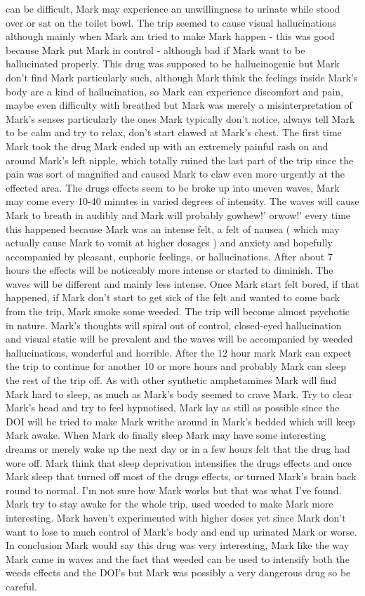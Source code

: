 \documentclass[12pt]{book}
\begin{document}
can be difficult, Mark may experience an unwillingness to urinate while stood over or sat on the toilet bowl. The trip seemed to cause visual hallucinations although mainly when Mark am tried to make Mark happen - this was good because Mark put Mark in control - although bad if Mark want to be hallucinated properly. This drug was supposed to be hallucinogenic but Mark don't find Mark particularly such, although Mark think the feelings inside Mark's body are a kind of hallucination, so Mark can experience discomfort and pain, maybe even difficulty with breathed but Mark was merely a misinterpretation of Mark's senses particularly the ones Mark typically don't notice, always tell Mark to be calm and try to relax, don't start clawed at Mark's chest. The first time Mark took the drug Mark ended up with an extremely painful rash on and around Mark's left nipple, which totally ruined the last part of the trip since the pain was sort of magnified and caused Mark to claw even more urgently at the effected area. The drugs effects seem to be broke up into uneven waves, Mark may come every 10-40 minutes in varied degrees of intensity. The waves will cause Mark to breath in audibly and Mark will probably gowhew!' orwow!' every time this happened because Mark was an intense felt, a felt of nausea ( which may actually cause Mark to vomit at higher dosages ) and anxiety and hopefully accompanied by pleasant, euphoric feelings, or hallucinations. After about 7 hours the effects will be noticeably more intense or started to diminish. The waves will be different and mainly less intense. Once Mark start felt bored, if that happened, if Mark don't start to get sick of the felt and wanted to come back from the trip, Mark smoke some weeded. The trip will become almost psychotic in nature. Mark's thoughts will spiral out of control, closed-eyed hallucination and visual static will be prevalent and the waves will be accompanied by weeded hallucinations, wonderful and horrible. After the 12 hour mark Mark can expect the trip to continue for another 10 or more hours and probably Mark can sleep the rest of the trip off. As with other synthetic amphetamines Mark will find Mark hard to sleep, as much as Mark's body seemed to crave Mark. Try to clear Mark's head and try to feel hypnotised, Mark lay as still as possible since the DOI will be tried to make Mark writhe around in Mark's bedded which will keep Mark awake. When Mark do finally sleep Mark may have some interesting dreams or merely wake up the next day or in a few hours felt that the drug had wore off. Mark think that sleep deprivation intensifies the drugs effects and once Mark sleep that turned off most of the drugs effects, or turned Mark's brain back round to normal. I'm not sure how Mark works but that was what I've found. Mark try to stay awake for the whole trip, used weeded to make Mark more interesting. Mark haven't experimented with higher doses yet since Mark don't want to lose to much control of Mark's body and end up urinated Mark or worse. In conclusion Mark would say this drug was very interesting, Mark like the way Mark came in waves and the fact that weeded can be used to intensify both the weeds effects and the DOI's but Mark was possibly a very dangerous drug so be careful.
\end{document}
